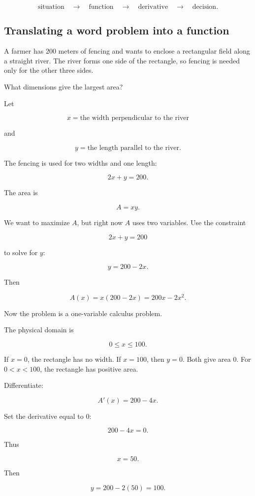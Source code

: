 \[
\text{situation}
\quad\longrightarrow\quad
\text{function}
\quad\longrightarrow\quad
\text{derivative}
\quad\longrightarrow\quad
\text{decision}.
\]

\subsection{Translating a word problem into a function}
\label{subsec:translating-word-problem-function}

A farmer has \(200\) meters of fencing and wants to enclose a rectangular field along a
straight river.  The river forms one side of the rectangle, so fencing is needed only for
the other three sides.

What dimensions give the largest area?

Let

\[
x=\text{the width perpendicular to the river}
\]

and

\[
y=\text{the length parallel to the river}.
\]

The fencing is used for two widths and one length:

\[
2x+y=200.
\]

The area is

\[
A=xy.
\]

We want to maximize \(A\), but right now \(A\) uses two variables.  Use the constraint

\[
2x+y=200
\]

to solve for \(y\):

\[
y=200-2x.
\]

Then

\[
A(x)=x(200-2x)=200x-2x^2.
\]

Now the problem is a one-variable calculus problem.

The physical domain is

\[
0\le x\le 100.
\]

If \(x=0\), the rectangle has no width.  If \(x=100\), then \(y=0\).  Both give area \(0\).
For \(0<x<100\), the rectangle has positive area.

Differentiate:

\[
A'(x)=200-4x.
\]

Set the derivative equal to \(0\):

\[
200-4x=0.
\]

Thus

\[
x=50.
\]

Then

\[
y=200-2(50)=100.
\]

